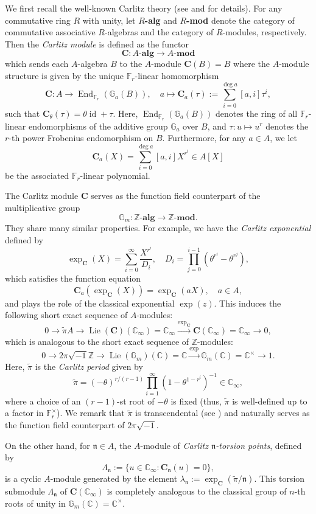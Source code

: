 \documentclass[12pt,reqno]{amsart}
\numberwithin{equation}{section}
\theoremstyle{plain}
\theoremstyle{definition}
\theoremstyle{remark}
\newcommand{\ZZ}{\mathbb{Z}}
\newcommand{\CC}{\mathbb{C}}
\newcommand{\FF}{\mathbb{F}}
\newcommand{\GG}{\mathbb{G}}
\newcommand{\nfk}{\mathfrak{n}}
\newcommand{\id}{\operatorname{id}}
\newcommand{\cpi}{\tilde{\pi}}
\newcommand{\C}{\mathbf{C}}
\begin{document}
We first recall the well-known Carlitz theory (see \cite{Goss1996} and \cite{Thakur2004} for details). For any commutative ring $R$ with unity, let $R$\textbf{-alg} and $R$\textbf{-mod} denote the category of commutative associative $R$-algebras and the category of $R$-modules, respectively. Then the \textit{Carlitz module} is defined as the functor
\[ \C: A\textbf{-alg} \to A\textbf{-mod} \]
which sends each $A$-algebra $B$ to the $A$-module $\C(B)=B$ where the $A$-module structure is given by the unique $\FF_r$-linear homomorphism 
\[ \C: A \to \operatorname{End}_{\mathbb{F}_r}(\GG_a(B)), \quad a\mapsto \C_a(\tau):=\sum_{i=0}^{\deg a}[a,i]\tau^i, \]
such that $\C_\theta(\tau)=\theta\id+\tau$. Here, $\operatorname{End}_{\FF_r}(\GG_a(B))$ denotes the ring of all $\FF_r$-linear endomorphisms of the additive group $\GG_a$ over $B$, and $\tau:u\mapsto u^r$ denotes the $r$-th power Frobenius endomorphism on $B$. Furthermore, for any $a\in A$, we let 
\[ \C_a(X)=\sum_{i=0}^{\deg a}[a,i]X^{r^i}\in A[X] \]
be the associated $\FF_r$-linear polynomial.

The Carlitz module $\C$ serves as the function field counterpart of the multiplicative group 
\[ \GG_m:\ZZ\textbf{-alg} \to \ZZ\textbf{-mod}. \]
They share many similar properties. For example, we have the \textit{Carlitz exponential} defined by
\[ \exp_\C(X)=\sum_{i=0}^\infty \frac{X^{r^i}}{D_i},\quad D_i=\prod_{j=0}^{i-1}(\theta^{r^i}-\theta^{r^j}), \]
which satisfies the function equation  
$$\C_a(\exp_\C(X))=\exp_\C(aX),\quad a\in A,$$
and plays the role of the classical exponential $\exp(z)$. This induces the following short exact sequence of $A$-modules:
\[
0 \longrightarrow \tilde{\pi} A \longrightarrow \operatorname{Lie}(\C)(\CC_\infty)=\CC_\infty \xrightarrow{\exp_{\C}} \C(\CC_\infty)=\CC_\infty \longrightarrow 0,
\]
which is analogous to the short exact sequence of $\ZZ$-modules:
\[
0 \longrightarrow 2\pi \sqrt{-1} \mathbb{Z} \longrightarrow \operatorname{Lie}(\GG_m)(\CC)=\mathbb{C} \xrightarrow{\exp} \GG_m(\CC)=\mathbb{C}^\times \longrightarrow 1.
\]
Here, $\cpi$ is the \textit{Carlitz period} given by
\[ {\cpi}=(-\theta)^{r/(r-1)}\prod_{i=1}^\infty \left(1-\theta^{1-r^i}\right)^{-1}\in\CC_\infty, \]
where a choice of an $(r-1)$-st root of $-\theta$ is fixed (thus, $\cpi$ is well-defined up to a factor in $\FF_r^\times$). We remark that $\cpi$ is transcendental (see \cite{Wade1941}) and naturally serves as the function field counterpart of $2\pi \sqrt{-1}$. 

On the other hand, for $\nfk\in A$, the $A$-module of \textit{Carlitz $\nfk$-torsion points}, defined by
\[ \Lambda_\nfk:=\{u\in\CC_\infty:\C_\nfk(u)=0\}, \]
is a cyclic $A$-module generated by the element $\lambda_\nfk:=\exp_\C(\cpi/\nfk)$. This torsion submodule $\Lambda_\nfk$ of $\C(\CC_\infty)$ is completely analogous to the classical group of $n$-th roots of unity in $\GG_m(\CC)=\mathbb{C}^\times$.
\end{document}

